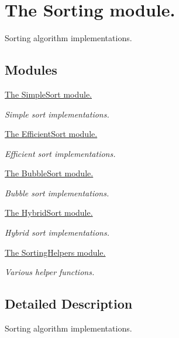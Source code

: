 \hypertarget{group__Sorting}{}\section{The Sorting module.}
\label{group__Sorting}


Sorting algorithm implementations.  


\subsection*{Modules}
\begin{DoxyCompactItemize}
\item 
\hyperlink{group__SimpleSort}{The Simple\+Sort module.}
\begin{DoxyCompactList}\small\item\em Simple sort implementations. \end{DoxyCompactList}\item 
\hyperlink{group__EfficientSort}{The Efficient\+Sort module.}
\begin{DoxyCompactList}\small\item\em Efficient sort implementations. \end{DoxyCompactList}\item 
\hyperlink{group__BubbleSort}{The Bubble\+Sort module.}
\begin{DoxyCompactList}\small\item\em Bubble sort implementations. \end{DoxyCompactList}\item 
\hyperlink{group__HybridSort}{The Hybrid\+Sort module.}
\begin{DoxyCompactList}\small\item\em Hybrid sort implementations. \end{DoxyCompactList}\item 
\hyperlink{group__SortingHelpers}{The Sorting\+Helpers module.}
\begin{DoxyCompactList}\small\item\em Various helper functions. \end{DoxyCompactList}\end{DoxyCompactItemize}


\subsection{Detailed Description}
Sorting algorithm implementations. 

